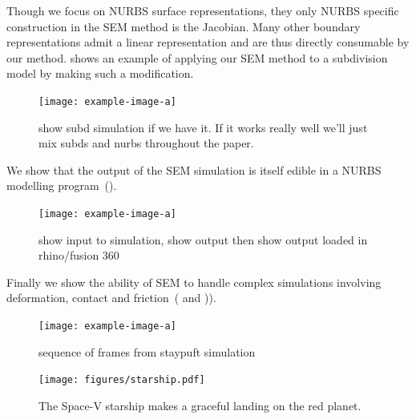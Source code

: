 Though we focus on NURBS surface representations, they only NURBS specific construction in the SEM method is the Jacobian.
Many other boundary representations admit a linear representation and are thus directly consumable by our method.
 shows an example of applying our SEM method to a subdivision model by making such a modification.
\begin{figure}
  \texttt{[image: example-image-a]}
  \caption{show subd simulation if we have it. If it works really well we'll just mix subds and nurbs throughout the paper. }
  \label{fig:subd}
\end{figure}

We show that the output of the SEM simulation is itself edible in a NURBS modelling program~().
\begin{figure}
  \texttt{[image: example-image-a]}
  \caption{show input to simulation, show output then show output loaded in rhino/fusion 360 }
  \label{fig:edit}
\end{figure}

Finally we show the ability of SEM to handle complex simulations involving deformation, contact and friction~( and )).
\begin{figure}[htp]
  \texttt{[image: example-image-a]}
  \caption{sequence of frames from staypuft simulation}
  \label{fig:staypuft}
\end{figure}

\begin{figure}[htp]
  \texttt{[image: figures/starship.pdf]}
  \caption{The Space-V starship makes a graceful landing on the red planet. }
  \label{fig:f1}
\end{figure}

